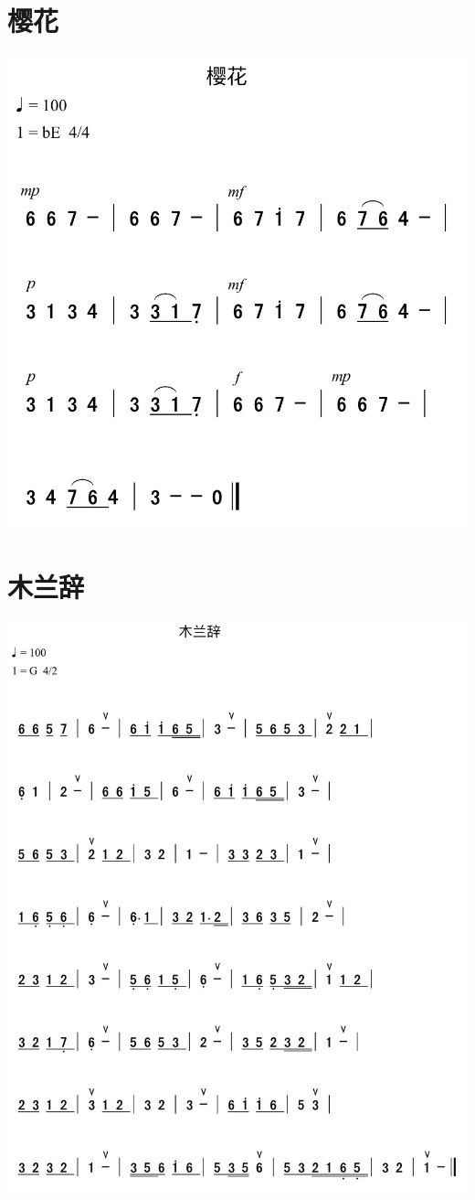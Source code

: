 \documentclass[cn,pad,chinese,chinesefont=nofont]{elegantbook}
\begin{document}
\section{樱花}
	\includegraphics[width=\textwidth]{dongxiao/IMG_0861-樱花.png}  
\section{木兰辞}
	\includegraphics[width=\textwidth]{dongxiao/IMG_0867-木兰辞.png}
\end{document}
